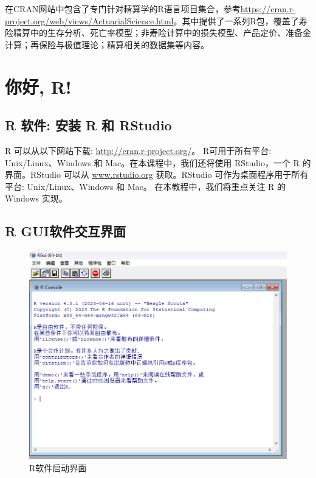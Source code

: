 \documentclass[
]{book}
\begin{document}
在CRAN网站中包含了专门针对精算学的R语言项目集合，参考\url{https://cran.r-project.org/web/views/ActuarialScience.html}。其中提供了一系列R包，覆盖了寿险精算中的生存分析、死亡率模型；非寿险计算中的损失模型、产品定价、准备金计算；再保险与极值理论；精算相关的数据集等内容。

\chapter{你好, R!}\label{ux4f60ux597d-r}

\section{R 软件: 安装 R 和 RStudio}\label{r-ux8f6fux4ef6-ux5b89ux88c5-r-ux548c-rstudio}

R 可以从以下网站下载: \url{http://cran.r-project.org/}。
R可用于所有平台: Unix/Linux、Windows 和 Mac。在本课程中，我们还将使用 RStudio，一个 R 的界面。RStudio 可以从 \url{www.rstudio.org} 获取。RStudio 可作为桌面程序用于所有平台: Unix/Linux、Windows 和 Mac。
在本教程中，我们将重点关注 R 的 Windows 实现。

\section{R GUI软件交互界面}\label{r-guiux8f6fux4ef6ux4ea4ux4e92ux754cux9762}

\begin{figure}

{\centering \includegraphics[width=0.8\linewidth]{figs/01-Rinterface} 

}

\caption{R软件启动界面}\label{fig:Rgui}
\end{figure}
\end{document}
